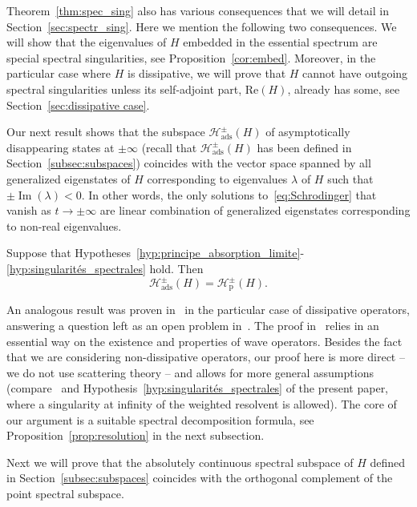 \documentclass[AHL,Unicode,longabstracts,published]{cedram}
\newcommand{\Hi}{\mathcal{H}}
\newcommand{\rmp}{\mathrm{p}}
\newcommand{\ads}{\mathrm{ads}}
\DeclareMathOperator{\im}{Im}
\newcommand{\Hi}{\mathcal{H}}
\newcommand{\rmp}{\mathrm{p}}
\DeclareMathOperator{\im}{Im}
\begin{document}
Theorem~\ref{thm:spec_sing} also has various consequences that we will detail in Section~\ref{sec:spectr_sing}. Here we mention the following two consequences. We will show that the eigenvalues of $H$ embedded in the essential spectrum are special spectral singularities, see Proposition~\ref{cor:embed}. Moreover, in the particular case where $H$ is dissipative, we will prove that $H$ cannot have outgoing spectral singularities unless its self-adjoint part, $\mathrm{Re}(H)$, already has some, see Section~\ref{sec:dissipative case}.


Our next result shows that the subspace $\Hi_\ads^\pm(H)$ of asymptotically disappearing states at $\pm\infty$ (recall that $\Hi_\ads^\pm(H)$ has been defined in Section~\ref{subsec:subspaces}) coincides with the vector space spanned by all generalized eigenstates of $H$ corresponding to eigenvalues $\lambda$ of $H$ such that $\pm\im(\lambda)<0$. In other words, the only solutions to~\eqref{eq:Schrodinger} that vanish as $t\to\pm\infty$ are linear combination of generalized eigenstates corresponding to non-real eigenvalues.

\begin{theo}\label{thm:caracterisation_etat_disparaissent_à_infini}
Suppose that Hypotheses~\ref{hyp:principe_absorption_limite}-\ref{hyp:singularités_spectrales} hold. Then
\begin{equation}
\Hi_\ads^\pm(H)=\Hi_\rmp^\pm(H).
\end{equation}
\end{theo}

An analogous result was proven in~\cite{FaFr18_01} in the particular case of dissipative operators, answering a question left as an open problem in~\cite{Da80_01}. The proof in~\cite{FaFr18_01} relies in an essential way on the existence and properties of wave operators. Besides the fact that we are considering non-dissipative operators, our proof here is more direct -- we do not use scattering theory -- and allows for more general assumptions (compare~\cite[Hypothesis 2.5]{FaFr18_01} and Hypothesis~\ref{hyp:singularités_spectrales} of the present paper, where a singularity at infinity of the weighted resolvent is allowed). The core of our argument is a suitable spectral decomposition formula, see Proposition~\ref{prop:resolution} in the next subsection.


Next we will prove that the absolutely continuous spectral subspace of $H$ defined in Section~\ref{subsec:subspaces} coincides with the orthogonal complement of the point spectral subspace.
\end{document}
